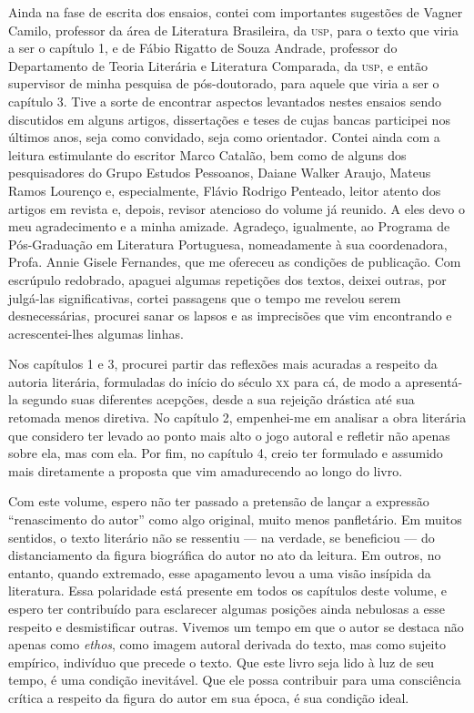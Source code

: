 Ainda na fase de escrita dos ensaios, contei com importantes sugestões de Vagner Camilo, professor da área de Literatura Brasileira, da \textsc{usp}, para o texto que viria a ser o capítulo 1, e de Fábio Rigatto de Souza Andrade, professor do Departamento de Teoria Literária e Literatura Comparada, da \textsc{usp}, e então supervisor de minha pesquisa de pós-doutorado, para aquele que viria a ser o capítulo 3. Tive a sorte de encontrar aspectos levantados nestes ensaios sendo discutidos em alguns artigos, dissertações e teses de cujas bancas participei nos últimos anos, seja como convidado, seja como orientador. Contei ainda com a leitura estimulante do escritor Marco Catalão, bem como de alguns dos pesquisadores do Grupo Estudos Pessoanos, Daiane Walker Araujo, Mateus Ramos Lourenço e, especialmente, Flávio Rodrigo Penteado, leitor atento dos artigos em revista e, depois, revisor atencioso do volume já reunido. A eles devo o meu agradecimento e a minha amizade. Agradeço, igualmente, ao Programa de Pós-Graduação em Literatura Portuguesa, nomeadamente à sua coordenadora, Profa. Annie Gisele Fernandes, que me ofereceu as condições de publicação. Com escrúpulo redobrado, apaguei algumas repetições dos textos, deixei outras, por julgá-las significativas, cortei passagens que o tempo me revelou serem desnecessárias, procurei sanar os lapsos e as imprecisões que vim encontrando e acrescentei-lhes algumas linhas. 

Nos capítulos 1 e 3, procurei partir das reflexões mais acuradas a respeito da autoria literária, formuladas do início do século \textsc{xx} para cá, de modo a apresentá-la segundo suas diferentes acepções, desde a sua rejeição drástica até sua retomada menos diretiva. No capítulo 2, empenhei-me em analisar a obra literária que considero ter levado ao ponto mais alto o jogo autoral e refletir não apenas sobre ela, mas com ela. Por fim, no capítulo 4, creio ter formulado e assumido mais diretamente a proposta que vim amadurecendo ao longo do livro. 

Com este volume, espero não ter passado a pretensão de lançar a expressão ``renascimento do autor'' como algo original, muito menos panfletário. Em muitos sentidos, o texto literário não se ressentiu --- na verdade, se beneficiou --- do distanciamento da figura biográfica do autor no ato da leitura. Em outros, no entanto, quando extremado, esse apagamento levou a uma visão insípida da literatura. Essa polaridade está presente em todos os capítulos deste volume, e espero ter contribuído para esclarecer algumas posições ainda nebulosas a esse respeito e desmistificar outras. Vivemos um tempo em que o autor se destaca não apenas como \emph{ethos}, como imagem autoral derivada do texto, mas como sujeito empírico, indivíduo que precede o texto. Que este livro seja lido à luz de seu tempo, é uma condição inevitável. Que ele possa contribuir para uma consciência crítica a respeito da figura do autor em sua época, é sua condição ideal. 